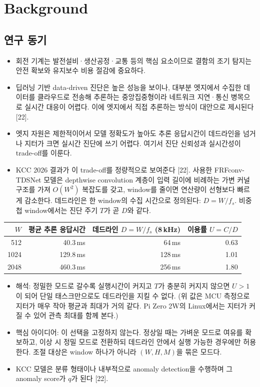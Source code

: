 \documentclass[10pt]{article}
\begin{document}
\section{Background}
\subsection{연구 동기}
\begin{itemize}
\item 회전 기계는 발전설비·생산공정·교통 등의 핵심 요소이므로 결함의 조기 탐지는 안전 확보와 유지보수 비용 절감에 중요하다.
\item 딥러닝 기반 data-driven 진단은 높은 성능을 보이나, 대부분 엣지에서 수집한 데이터를 클라우드로 전송해 추론하는 중앙집중형이라 네트워크 지연·통신 병목으로 실시간 대응이 어렵다. 이에 엣지에서 직접 추론하는 방식이 대안으로 제시된다 [22].
\item 엣지 자원은 제한적이어서 모델 정확도가 높아도 추론 응답시간이 데드라인을 넘거나 지터가 크면 실시간 진단에 쓰기 어렵다. 여기서 진단 신뢰성과 실시간성이 trade-off를 이룬다.
\item KCC 2026 결과가 이 trade-off를 정량적으로 보여준다 [22]. 사용한 FRFconv-TDSNet 모델은 depthwise convolution 계층이 입력 길이에 비례하는 가변 커널 구조를 가져 $O(W^2)$ 복잡도를 갖고, window를 줄이면 연산량이 선형보다 빠르게 감소한다. 데드라인은 한 window의 수집 시간으로 정의된다: $D=W/f_s$. 비중첩 window에서는 진단 주기 $T$가 곧 $D$와 같다.
\end{itemize}
\begin{center}\footnotesize
\begin{tabular}{@{}rrrr@{}}
\toprule
$W$ & 평균 추론 응답시간 & 데드라인 $D=W/f_s$ (8\,kHz) & 이용률 $U=C/D$ \\ \midrule
512 & 40.3\,ms & 64\,ms & 0.63 \\
1024 & 129.8\,ms & 128\,ms & 1.01 \\
2048 & 460.3\,ms & 256\,ms & 1.80 \\
\bottomrule
\end{tabular}
\end{center}
\begin{itemize}
\item 해석: 정밀한 모드로 갈수록 실행시간이 커지고 $T$가 충분히 커지지 않으면 $U>1$이 되어 단일 태스크만으로도 데드라인을 지킬 수 없다. (위 값은 MCU 측정으로 지터가 매우 작아 평균과 최대가 거의 같다. Pi Zero 2W의 Linux에서는 지터가 커질 수 있어 관측 최대를 함께 본다.)
\item 핵심 아이디어: 이 선택을 고정하지 않는다. 정상일 때는 가벼운 모드로 여유를 확보하고, 이상 시 정밀 모드로 전환하되 데드라인 안에서 실행 가능한 경우에만 허용한다. 조절 대상은 window 하나가 아니라 $(W,H,M)$을 묶은 모드다.
\item KCC 모델은 분류 형태이나 내부적으로 anomaly detection을 수행하며 그 anomaly score가 $q$가 된다 [22].
\end{itemize}
\end{document}
